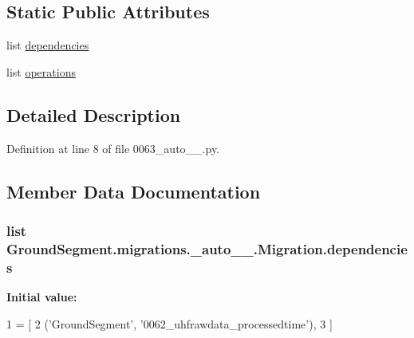 \subsection*{Static Public Attributes}
\begin{DoxyCompactItemize}
\item 
list \hyperlink{class_ground_segment_1_1migrations_1_10063__auto__20170601__1929_1_1_migration_ad517ec3a254fb4d1f4a15fbc69b6828e}{dependencies}
\item 
list \hyperlink{class_ground_segment_1_1migrations_1_10063__auto__20170601__1929_1_1_migration_abe719102f2ab1088ea7139734deb99c9}{operations}
\end{DoxyCompactItemize}


\subsection{Detailed Description}


Definition at line 8 of file 0063\+\_\+auto\+\_\+\_.\+py.



\subsection{Member Data Documentation}
\hypertarget{class_ground_segment_1_1migrations_1_10063__auto__20170601__1929_1_1_migration_ad517ec3a254fb4d1f4a15fbc69b6828e}{}
\subsubsection[{dependencies}]{\setlength{\rightskip}{0pt plus 5cm}list Ground\+Segment.\+migrations.\+\_\+auto\+\_\+\_.\+Migration.\+dependencies\hspace{0.3cm}{\ttfamily [static]}}\label{class_ground_segment_1_1migrations_1_10063__auto__20170601__1929_1_1_migration_ad517ec3a254fb4d1f4a15fbc69b6828e}
{\bfseries Initial value\+:}
\begin{DoxyCode}
1 = [
2         (\textcolor{stringliteral}{'GroundSegment'}, \textcolor{stringliteral}{'0062\_uhfrawdata\_processedtime'}),
3     ]
\end{DoxyCode}


